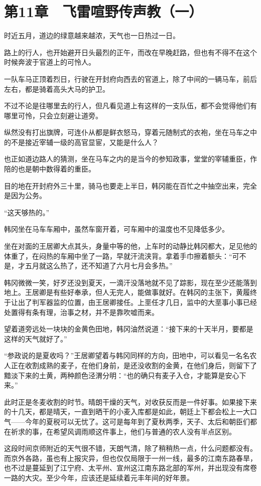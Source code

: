 \section{第11章　飞雷喧野传声教（一）}

时近五月，道边的绿意越来越浓，天气也一日热过一日。

路上的行人，也开始避开日头最烈的正午，而改在早晚赶路，但也有不得不在这个时候奔波于官道上的可怜人。

一队车马正顶着烈日，行驶在开封府向西去的官道上，除了中间的一辆马车，前后左右，都是骑着高头大马的护卫。

不过不论是往哪里去的行人，但凡看见道上有这样的一支队伍，都不会觉得他们有哪里可怜，只会立刻避让道旁。

纵然没有打出旗牌，可连仆从都是鲜衣怒马，穿着元随制式的衣袍，坐在马车之中的不是接近宰辅一级的高官显宦，又能是什么人？

也正如道边路人的猜测，坐在马车之内的是当今的参知政事，堂堂的宰辅重臣，作陪的也是朝中数得着的重臣。

目的地在开封府外三十里，骑马也要走上半日，韩冈能在百忙之中抽空出来，完全是因为公务。

“这天够热的。”

韩冈坐在马车车厢中，虽然车窗开着，可车厢中的温度也不见降低多少。

坐在对面的王居卿大点其头，身量中等的他，上车时的动静比韩冈都大，足见他的体重了，在闷热的车厢中坐了一路，早就汗流浃背。拿着手巾擦着额头：“可不是，才五月就这么热了，还不知道了六月七月会多热。”

韩冈微微一笑，好歹还没到夏天，一滴汗没落地就不见了踪影，现在至少还能落到地上。王居卿是有些好奉承，但人无完人，能做事就好。在韩冈的主张下，黄履终于让出了判军器监的位置，由王居卿接任。上垩任才几日，监中的大垩事小事已经处置得有条有理，治事之材，并不是靠吹嘘而来。

望着道旁远处一块块的金黄色田地，韩冈油然说道：“接下来的十天半月，要都是这样的天气就好了。”

“参政说的是夏收吗？”王居卿望着与韩冈同样的方向，田地中，可以看见一名名农人正在收割成熟的麦子，在他们身前，是还没收割的金黄，在他们身后，则留下了黯淡下来的土黄，两种颜色泾渭分明：“也的确只有麦子入仓，才能算是安心下来。”

此时正是冬麦收割的时节。晴朗干燥的天气，对收获反而是一件好事。如果接下来的十几天，都是晴天，一直到晒干的小麦入库都是如此，朝廷上下都会松上一大口气——今年的夏税可以无忧了。这可是每年到了夏秋两季，天子、太后和朝臣们都在祈求的事，在希望风调雨顺这件事上，他们与普通的农人没有半点区别。

这段时间京师附近的天气很不错，天朗气清，除了稍稍热一点，什么问题都没有。而京外各路，虽也有上报灾异，但也仅仅局限于一州一线，最多的江南东路春旱，也不过是蔓延到了江宁府、太平州、宣州这江南东路北部的军州，并出现没有席卷一路的大灾。至少今年，应该还是延续着元丰年间的好年景。

